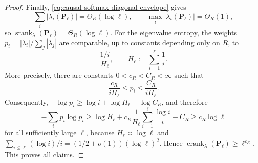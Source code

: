 \documentclass{article}
\newcommand{\srank}{\operatorname{srank}}
\newcommand{\erank}{\operatorname{erank}}
\newcommand{\bP}{\mathbf{P}}
\theoremstyle{definition}
\theoremstyle{remark}
\begin{document}
\begin{proof}
Finally, \eqref{eq:causal-softmax-diagonal-envelope} gives
\[
    \sum_i|\lambda_i(\bP_\ell)|
    =
    \Theta_R(\log\ell),
    \qquad
    \max_i|\lambda_i(\bP_\ell)|
    =
    \Theta_R(1),
\]
so $\srank_\lambda(\bP_\ell)=\Theta_R(\log\ell)$.  For the eigenvalue entropy,
the weights $p_i=|\lambda_i|/\sum_j|\lambda_j|$ are comparable, up to constants
depending only on $R$, to
\[
    \frac{1/i}{H_\ell},
    \qquad
    H_\ell:=\sum_{i=1}^{\ell}\frac1i.
\]
More precisely, there are constants $0<c_R<C_R<\infty$ such that
\[
    \frac{c_R}{iH_\ell}
    \leq p_i\leq
    \frac{C_R}{iH_\ell}.
\]
Consequently, $-\log p_i\geq \log i+\log H_\ell-\log C_R$, and therefore
\[
    -\sum_i p_i\log p_i
    \geq
    \log H_\ell
    +
    c_R
    \frac{1}{H_\ell}\sum_{i=1}^{\ell}\frac{\log i}{i}
    -
    C_R
    \geq
    c_R\log\ell
\]
for all sufficiently large $\ell$, because $H_\ell\asymp\log\ell$ and
$\sum_{i\leq\ell}(\log i)/i=(1/2+o(1))(\log\ell)^2$.  Hence
$\erank_\lambda(\bP_\ell)\geq \ell^{c_R}$.  This proves all claims.
\end{proof}
\end{document}
